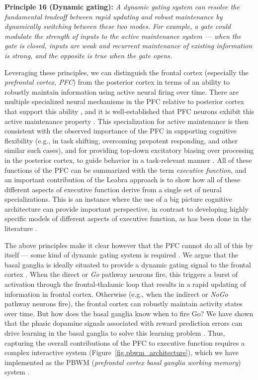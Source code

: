 \documentclass[11pt,twoside]{article}
\begin{document}
{\bf Principle 16 (Dynamic gating):}  {\em A dynamic gating system can resolve the fundamental tradeoff between rapid updating and robust maintenance by dynamically switching between these two modes.  For example, a gate could modulate the strength of inputs to the active maintenance system --- when the gate is closed, inputs are weak and recurrent maintenance of existing information is strong, and the opposite is true when the gate opens.}

Leveraging these principles, we can distinguish the frontal cortex (especially the {\em prefrontal cortex, PFC}) from the posterior cortex in terms of an ability to robustly maintain information using active neural firing over time.  There are multiple specialized neural mechanisms in the PFC relative to posterior cortex that support this ability \cite{WangEtAl,HazyEtAlInPrep}, and it is well-established that PFC neurons exhibit this active maintenance property \cite{pfccites}.  This specialization for active maintenance is then consistent with the observed importance of the PFC in supporting cognitive flexibility (e.g., in task shifting, overcoming prepotent responding, and other similar such cases), and for providing top-down excitatory biasing over processing in the posterior cortex, to guide behavior in a task-relevant manner \cite{MillerCohen01,etc}.  All of these functions of the PFC can be summarized with the term {\em executive function}, and an important contribution of the Leabra approach is to show how all of these different aspects of executive function derive from a single set of neural specializations.  This is an instance where the use of a big picture cognitive architecture can provide important perspective, in contrast to developing highly specific models of different aspects of executive function, as has been done in the literature \cite{spec-ef-models}.

The above principles make it clear however that the PFC cannot do all of this by itself --- some kind of dynamic gating system is required \cite{OReillyBraverCohen99}.  We argue that the basal ganglia is ideally situated to provide a dynamic gating signal to the frontal cortex \cite{FrankLoughryOReilly01}.  When the direct or {\em Go} pathway neurons fire, this triggers a burst of activation through the frontal-thalamic loop that results in a rapid updating of information in frontal cortex.  Otherwise (e.g., when the indirect or {\em NoGo} pathway neurons fire), the frontal cortex can robustly maintain activity states over time.  But how does the basal ganglia know when to fire Go?  We have shown that the phasic dopamine signals associated with reward prediction errors can drive learning in the basal ganglia to solve this learning problem \cite{OReillyFrank06}.  Thus, capturing the overall contributions of the PFC to executive function requires a complex interactive system (Figure~\ref{fig.pbwm_architecture}), which we have implemented as the PBWM ({\em prefrontal cortex basal ganglia working memory}) system \cite{OReillyFrank06,HazyEtAls}.  
\end{document}
